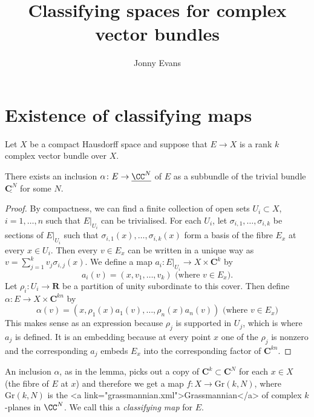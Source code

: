 \title{Classifying spaces for complex vector bundles}

\author{Jonny Evans}





\section{Existence of classifying maps}

Let $X$ be a compact Hausdorff space and suppose that $E\to X$ is a rank $k$ complex vector bundle over $X$.
\begin{Lemma}[lma1]
There exists an inclusion $\alpha\colon E\to\underline{\CC^N}$ of $E$ as a subbundle of the trivial bundle $\underline{\mathbf{C}^N}$ for some $N$.
\end{Lemma}
\begin{proof}
By compactness, we can find a finite collection of open sets $U_i\subset X$, $i=1,\ldots,n$ such that $E|_{U_i}$ can be trivialised. For each $U_i$, let $\sigma_{i,1},\ldots,\sigma_{i,k}$ be sections of $E|_{U_i}$ such that $\sigma_{i,1}(x),\ldots,\sigma_{i,k}(x)$ form a basis of the fibre $E_x$ at every $x\in U_i$. Then every $v\in E_x$ can be written in a unique way as $v=\sum_{j=1}^kv_j\sigma_{i,j}(x)$. We define a map $a_i\colon E|_{U_i}\to X\times\mathbf{C}^k$ by
\[a_i(v)=(x,v_1,\ldots,v_k)\mbox{ (where }v\in E_x\mbox{).}\]
Let $\rho_i\colon U_i\to\mathbf{R}$ be a partition of unity subordinate to this cover. Then define $\alpha\colon E\to X\times\mathbf{C}^{kn}$ by
\[\alpha(v)=(x,\rho_1(x)a_1(v),\ldots,\rho_n(x)a_n(v))\mbox{ (where }v\in E_x\mbox{)}\]
This makes sense as an expression because $\rho_j$ is supported in $U_j$, which is where $a_j$ is defined. It is an embedding because at every point $x$ one of the $\rho_j$ is nonzero and the corresponding $a_j$ embeds $E_x$ into the corresponding factor of $\mathbf{C}^{kn}$.
\end{proof}

\begin{Definition}[dfn1]
An inclusion $\alpha$, as in the lemma, picks out a copy of $\mathbf{C}^k\subset\mathbf{C}^N$ for each $x\in X$ (the fibre of $E$ at $x$) and therefore we get a map $f\colon X\to\mathrm{Gr}(k,N)$, where $\mathrm{Gr}(k,N)$ is the <a link="grassmannian.xml">Grassmannian</a> of complex $k$-planes in $\CC^N$. We call this a {\em classifying map} for $E$.
\end{Definition}


